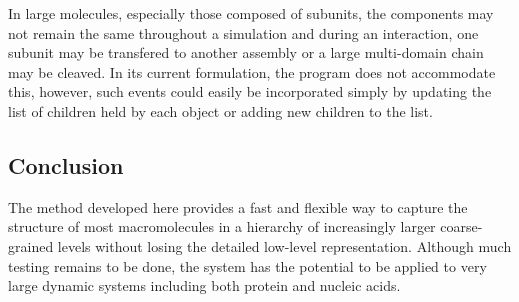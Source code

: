 In large molecules, especially those composed of subunits, the components may not
remain the same throughout a simulation and during an interaction, one subunit may
be transfered to another assembly or a large multi-domain chain may be cleaved.
In its current formulation, the program does not accommodate this, however, such
events could easily be incorporated simply by updating the list of children held
by each object or adding new children to the list. 

\subsection{Conclusion}

The method developed here provides a fast and flexible way to capture the
structure of most macromolecules in a hierarchy of increasingly larger coarse-grained
levels without losing the detailed low-level representation.   Although much testing
remains to be done, the system has the potential to be applied to very large dynamic
systems including both protein and nucleic acids.
